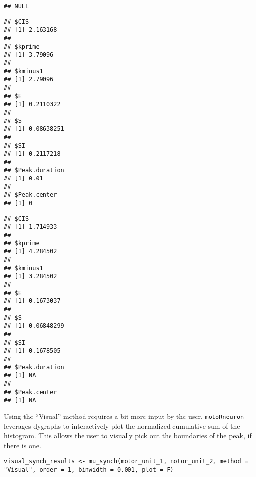 \documentclass[]{article}
\newenvironment{Shaded}{\begin{snugshade}}{\end{snugshade}}
\newcommand{\DataTypeTok}[1]{\textcolor[rgb]{0.13,0.29,0.53}{#1}}
\newcommand{\StringTok}[1]{\textcolor[rgb]{0.31,0.60,0.02}{#1}}
\newcommand{\OperatorTok}[1]{\textcolor[rgb]{0.81,0.36,0.00}{\textbf{#1}}}
\newcommand{\NormalTok}[1]{#1}
\begin{document}
\begin{Shaded}
\end{Shaded}

\begin{verbatim}
## NULL
\end{verbatim}

\begin{Shaded}
\end{Shaded}

\begin{verbatim}
## $CIS
## [1] 2.163168
## 
## $kprime
## [1] 3.79096
## 
## $kminus1
## [1] 2.79096
## 
## $E
## [1] 0.2110322
## 
## $S
## [1] 0.08638251
## 
## $SI
## [1] 0.2117218
## 
## $Peak.duration
## [1] 0.01
## 
## $Peak.center
## [1] 0
\end{verbatim}

\begin{Shaded}
\end{Shaded}

\begin{verbatim}
## $CIS
## [1] 1.714933
## 
## $kprime
## [1] 4.284502
## 
## $kminus1
## [1] 3.284502
## 
## $E
## [1] 0.1673037
## 
## $S
## [1] 0.06848299
## 
## $SI
## [1] 0.1678505
## 
## $Peak.duration
## [1] NA
## 
## $Peak.center
## [1] NA
\end{verbatim}

Using the ``Visual'' method requires a bit more input by the user.
\texttt{motoRneuron} leverages dygraphs to interactively plot the
normalized cumulative sum of the histogram. This allows the user to
visually pick out the boundaries of the peak, if there is one.

\begin{verbatim}
visual_synch_results <- mu_synch(motor_unit_1, motor_unit_2, method = "Visual", order = 1, binwidth = 0.001, plot = F)
\end{verbatim}
\end{document}
